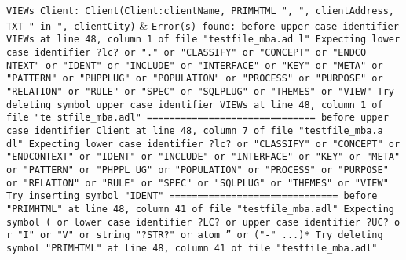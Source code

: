 \texttt{VIEWs Client: Client(Client:clientName, PRIMHTML ", ", clientAddress, TXT " in ", clientCity)} & \texttt{Error(s) found:\newline
  \newline
  before upper case identifier VIEWs at line 48, column 1 of file "testfile\_mba.ad\newline
  l"\newline
  Expecting lower case identifier ?lc? or "." or "CLASSIFY" or "CONCEPT" or "ENDCO\newline
  NTEXT" or "IDENT" or "INCLUDE" or "INTERFACE" or "KEY" or "META" or "PATTERN" or\newline
   "PHPPLUG" or "POPULATION" or "PROCESS" or "PURPOSE" or "RELATION" or "RULE" or\newline
  "SPEC" or "SQLPLUG" or "THEMES" or "VIEW"\newline
  Try deleting symbol upper case identifier VIEWs at line 48, column 1 of file "te\newline
  stfile\_mba.adl"\newline
  \newline
  ==============================\newline
  \newline
  before upper case identifier Client at line 48, column 7 of file "testfile\_mba.a\newline
  dl"\newline
  Expecting lower case identifier ?lc? or "CLASSIFY" or "CONCEPT" or "ENDCONTEXT"\newline
  or "IDENT" or "INCLUDE" or "INTERFACE" or "KEY" or "META" or "PATTERN" or "PHPPL\newline
  UG" or "POPULATION" or "PROCESS" or "PURPOSE" or "RELATION" or "RULE" or "SPEC"\newline
  or "SQLPLUG" or "THEMES" or "VIEW"\newline
  Try inserting symbol "IDENT"\newline
  \newline
  ==============================\newline
  \newline
  before "PRIMHTML" at line 48, column 41 of file "testfile\_mba.adl"\newline
  Expecting symbol ( or lower case identifier ?LC? or upper case identifier ?UC? o\newline
  r "I" or "V" or string "?STR?" or atom '' or ("-" ...)*\newline
  Try deleting symbol "PRIMHTML" at line 48, column 41 of file "testfile\_mba.adl"\newline
}
